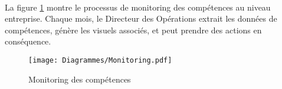 \paragraph{} La figure \ref{monitoringComp} montre le processus de monitoring des compétences au niveau entreprise. Chaque mois, le Directeur des Opérations extrait les données de compétences, génère les visuels associés, et peut prendre des actions en conséquence.


\begin{figure}
	\centering
	\texttt{[image: Diagrammes/Monitoring.pdf]}
	\caption{Monitoring des compétences}
	\label{monitoringComp}
\end{figure}